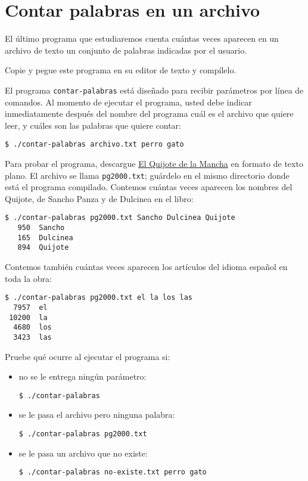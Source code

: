 \section{Contar palabras en un archivo}

El último programa que estudiaremos cuenta cuántas veces aparecen en un
archivo de texto un conjunto de palabras indicadas por el usuario.

Copie y pegue este programa en su editor de texto y compílelo.

El programa \lstinline!contar-palabras! está diseñado para recibir
parámetros por línea de comandos. Al momento de ejecutar el programa,
usted debe indicar inmediatamente después del nombre del programa cuál
es el archivo que quiere leer, y cuáles son las palabras que quiere
contar:

\begin{lstlisting}
$ ./contar-palabras archivo.txt perro gato
\end{lstlisting}

Para probar el programa, descargue
\href{http://www.gutenberg.org/ebooks/2000.txt.utf8}{El Quijote de la
Mancha} en formato de texto plano. El archivo se llama
\lstinline!pg2000.txt!; guárdelo en el mismo directorio donde está el
programa compilado. Contemos cuántas veces aparecen los nombres del
Quijote, de Sancho Panza y de Dulcinea en el libro:

\begin{lstlisting}
$ ./contar-palabras pg2000.txt Sancho Dulcinea Quijote
   950  Sancho
   165  Dulcinea
   894  Quijote
\end{lstlisting}

Contemos también cuántas veces aparecen los artículos del idioma español
en toda la obra:

\begin{lstlisting}
$ ./contar-palabras pg2000.txt el la los las
  7957  el
 10200  la
  4680  los
  3423  las
\end{lstlisting}

Pruebe qué ocurre al ejecutar el programa si:

\begin{itemize}
\item
  no se le entrega ningún parámetro:

\begin{lstlisting}
$ ./contar-palabras
\end{lstlisting}
\item
  se le pasa el archivo pero ninguna palabra:

\begin{lstlisting}
$ ./contar-palabras pg2000.txt
\end{lstlisting}
\item
  se le pasa un archivo que no existe:

\begin{lstlisting}
$ ./contar-palabras no-existe.txt perro gato
\end{lstlisting}
\end{itemize}

